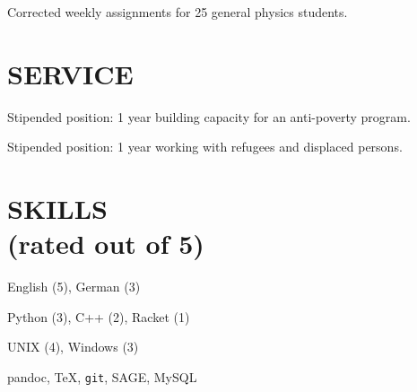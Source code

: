 \documentclass[margin]{res}
\begin{document}
\begin{resume}
\begin{details}
\item{Corrected weekly assignments for 25 general physics students.}
\end{details} 

\section{SERVICE}

\begin{details}
\item{Stipended position: 1 year building capacity for an anti-poverty program.}
\end{details}

\begin{details}
\item{Stipended position: 1 year working with refugees and displaced persons.}
\end{details}

\section{SKILLS\\ (rated out of 5)} \vspace{0pt}
\begin{multicols}{2} \parskip=0pt

\begin{details}
\item English (5), German (3)
\end{details}

\begin{details}
\item Python (3), C++ (2), Racket (1)
\end{details}

\begin{details}
\item UNIX (4), Windows (3)
\end{details}   

\begin{details}
\item pandoc, \TeX, \texttt{git}, SAGE, MySQL 
\end{details}   


\end{multicols}
\end{resume}
\end{document}
